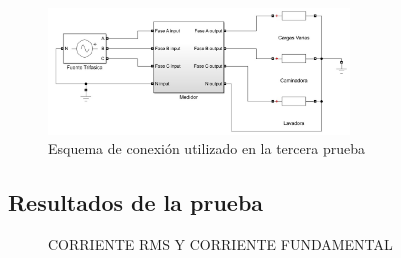     \begin{figure}[H]
      \begin{center}
          \includegraphics[width = 8cm]{4Resultados/conexion3.jpeg}
          \caption{ Esquema de conexión utilizado en la tercera prueba } 
          \label{fig:conexion3}
     \end{center}
    \end{figure}
    \subsection{Resultados de la prueba}
    \begin{figure}[H]
      \hfill
      \hfill
      \hfill
      \caption{CORRIENTE RMS Y CORRIENTE FUNDAMENTAL}
      \end{figure}

